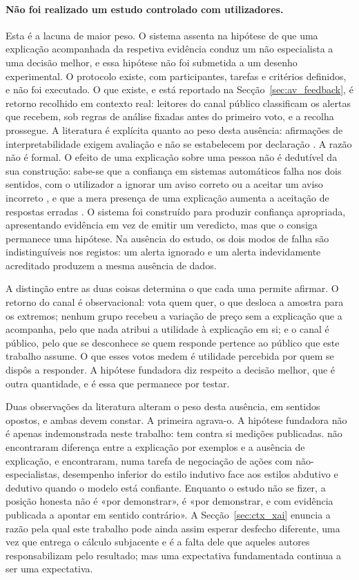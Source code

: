 \paragraph{Não foi realizado um estudo controlado com utilizadores.}
Esta é a lacuna de maior peso. O sistema assenta na hipótese de que uma explicação acompanhada
da respetiva evidência conduz um não especialista a uma decisão melhor, e essa hipótese não foi
submetida a um desenho experimental. O protocolo existe, com participantes, tarefas e critérios
definidos, e não foi executado. O que existe, e está reportado na
Secção~\ref{sec:av_feedback}, é retorno recolhido em contexto real: leitores do canal público
classificam os alertas que recebem, sob regras de análise fixadas antes do primeiro voto, e a
recolha prossegue. A literatura é explícita quanto ao peso desta ausência: afirmações
de interpretabilidade exigem avaliação e não se estabelecem por declaração
\autocite{doshivelez2018considerations}. A razão não é formal. O efeito de uma explicação sobre uma pessoa
não é dedutível da sua construção: sabe-se que a confiança em sistemas automáticos falha nos dois
sentidos, com o utilizador a ignorar um aviso correto ou a aceitar um aviso incorreto
\autocite{lee2004trust}, e que a mera presença de uma explicação aumenta a aceitação de respostas
erradas \autocite{bansal2021whole}. O sistema foi construído para produzir confiança apropriada,
apresentando evidência em vez de emitir um veredicto, mas que o consiga permanece uma hipótese. Na
ausência do estudo, os dois modos de falha são indistinguíveis nos registos: um alerta ignorado e um
alerta indevidamente acreditado produzem a mesma ausência de dados.

A distinção entre as duas coisas determina o que cada uma permite afirmar. O retorno do
canal é observacional: vota quem quer, o que desloca a amostra para os extremos; nenhum
grupo recebeu a variação de preço sem a explicação que a acompanha, pelo que nada atribui a
utilidade à explicação em si; e o canal é público, pelo que se desconhece se quem responde
pertence ao público que este trabalho assume. O que esses votos medem é utilidade percebida
por quem se dispôs a responder. A hipótese fundadora diz respeito a decisão melhor, que é
outra quantidade, e é essa que permanece por testar.

Duas observações da literatura alteram o peso desta ausência, em sentidos opostos, e ambas devem
constar. A primeira agrava-o. A hipótese fundadora não é apenas indemonstrada neste trabalho: tem
contra si medições publicadas. \textcite{waa2021xai} não encontraram diferença entre a explicação
por exemplos e a ausência de explicação, e \textcite{cau2023logicstyle} encontraram, numa tarefa de
negociação de ações com não-especialistas, desempenho inferior do estilo indutivo face aos estilos
abdutivo e dedutivo quando o modelo está confiante. Enquanto o estudo não se fizer, a posição
honesta não é «por demonstrar», é «por demonstrar, e com evidência publicada a apontar em sentido
contrário». A Secção~\ref{sec:ctx_xai} enuncia a razão pela qual este trabalho pode ainda assim
esperar desfecho diferente, uma vez que entrega o cálculo subjacente e é a falta dele que aqueles
autores responsabilizam pelo resultado; mas uma expectativa fundamentada continua a ser uma expectativa.

